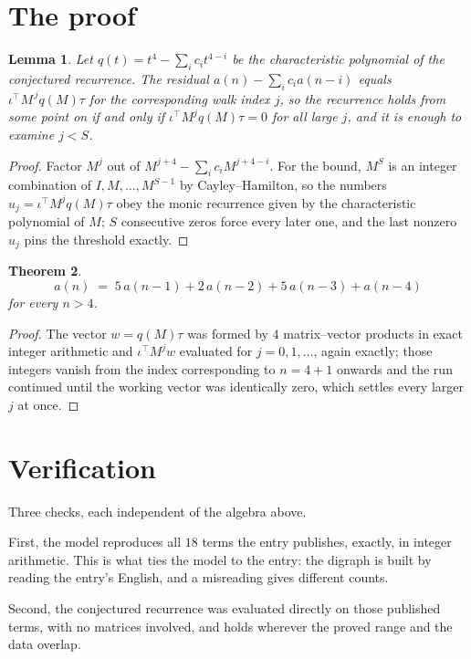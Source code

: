 \documentclass[11pt,a4paper]{article}
\theoremstyle{plain}
\newtheorem{theorem}{Theorem}
\newtheorem{lemma}[theorem]{Lemma}
\theoremstyle{definition}
\begin{document}
\section{The proof}

\begin{lemma}\label{lem:crit}
Let $q(t)=t^{4}-\sum_i c_it^{4-i}$ be the characteristic polynomial of the
conjectured recurrence. The residual $a(n)-\sum_ic_ia(n-i)$ equals
$\iota^{\!\top}M^{\,j}q(M)\tau$ for the corresponding walk index $j$, so the recurrence
holds from some point on if and only if $\iota^{\!\top}M^{j}q(M)\tau=0$ for all large $j$,
and it is enough to examine $j<S$.
\end{lemma}

\begin{proof}
Factor $M^{j}$ out of $M^{j+4}-\sum_ic_iM^{j+4-i}$. For the bound, $M^{S}$
is an integer combination of $I,M,\dots,M^{S-1}$ by Cayley--Hamilton, so the numbers
$u_j=\iota^{\!\top}M^{j}q(M)\tau$ obey the monic recurrence given by the characteristic
polynomial of $M$; $S$ consecutive zeros force every later one, and the last nonzero $u_j$
pins the threshold exactly.
\end{proof}

\begin{theorem}
\[
a(n)\;=\;5\,a(n-1) + 2\,a(n-2) + 5\,a(n-3) + a(n-4)
\]
for every $n>4$.
\end{theorem}

\begin{proof}
The vector $w=q(M)\tau$ was formed by $4$ matrix--vector products in exact integer
arithmetic and $\iota^{\!\top}M^{j}w$ evaluated for $j=0,1,\dots$, again exactly; those
integers vanish from the index corresponding to $n=4+1$ onwards and the run continued
until the working vector was identically zero, which settles every larger $j$ at once.
\end{proof}

\section{Verification}

Three checks, each independent of the algebra above.

First, the model reproduces all $18$ terms the entry publishes, exactly, in integer
arithmetic. This is what ties the model to the entry: the digraph is built by reading the
entry's English, and a misreading gives different counts.

Second, the conjectured recurrence was evaluated directly on those published terms, with no
matrices involved, and holds wherever the proved range and the data overlap.
\end{document}
